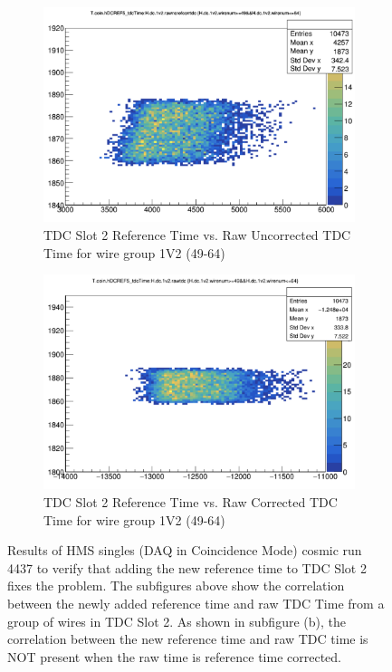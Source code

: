 \documentclass[11pt]{article}
\begin{document}
\begin{figure}[h!]
\centering
\begin{subfigure}{.5\textwidth}
  \centering
  \includegraphics[width=.8\linewidth]{hdcref5_corr.png}
  \caption{TDC Slot 2 Reference Time vs. Raw Uncorrected TDC \\Time for wire group 1V2 (49-64)}
  \label{fig:ref5_correlated}
\end{subfigure}%
\begin{subfigure}{.5\textwidth}
  \centering
  \includegraphics[width=.8\linewidth]{hdcref5_uncorr.png}
  \caption{TDC Slot 2 Reference Time vs. Raw Corrected TDC \\Time for wire group 1V2 (49-64)}
  \label{fig:ref5_uncorrelated}
\end{subfigure}
\caption{Results of HMS singles (DAQ in Coincidence Mode) cosmic run 4437 to verify that adding the new reference time to TDC Slot 2 fixes the problem.
  The subfigures above show the correlation between the newly added reference time and raw TDC Time from a group of wires in TDC Slot 2. As shown in subfigure (b), the correlation
  between the new reference time and raw TDC time is NOT present when the raw time is reference time corrected.}
\label{fig:hdc_Ref5}
\end{figure}
\end{document}
